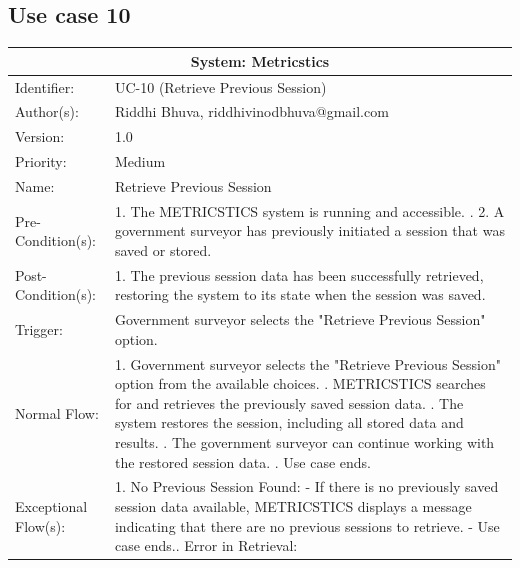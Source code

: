 
\begin{table}[h]
\subsection*{Use case 10}
\begin{tabular}{ | p{4cm} | p{10cm} | }
 \hline
 \multicolumn{2}{|c|}{System: Metricstics} \\
 \hline
 Identifier: & UC-10 (Retrieve Previous Session) \\
 \hline
 Author(s): & Riddhi Bhuva, riddhivinodbhuva@gmail.com     \\
 \hline
 Version: & 1.0	\\
 \hline
 Priority: & Medium	\\
 \hline
 Name: & Retrieve Previous Session   \\
 \hline
 Pre-Condition(s):  & {1. The METRICSTICS system is running and accessible. \newline 2. 2. A government surveyor has previously initiated a session that was saved or stored.   }\\
 \hline
 Post-Condition(s):  & {1. The previous session data has been successfully retrieved, restoring the system to its state when the session was saved.  }\\
 \hline
 Trigger: & Government surveyor selects the "Retrieve Previous Session" option. \\
 \hline
 Normal Flow:  & {1. Government surveyor selects the "Retrieve Previous Session" option from the available choices. \newline 2. METRICSTICS searches for and retrieves the previously saved session data. \newline 3. The system restores the session, including all stored data and results. \newline 4. The government surveyor can continue working with the restored session data. \newline 5. Use case ends.}\\
 \hline
 Exceptional Flow(s):  & {1. No Previous Session Found: \newline
   - If there is no previously saved session data available, METRICSTICS displays a message indicating that there are no previous sessions to retrieve.\newline
   - Use case ends.\newline
   2. Error in Retrieval: \newline
}
\end{tabular}
\end{table}
